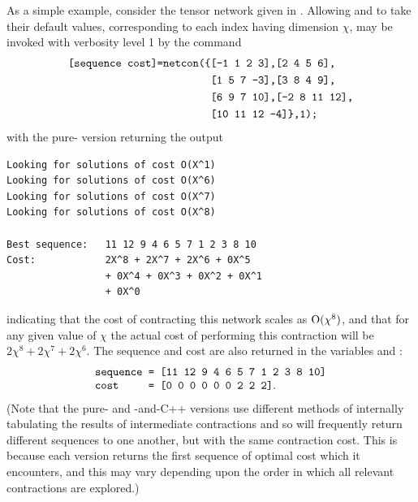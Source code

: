 
As a simple example, consider the tensor network given in . Allowing  and  to take their default values, corresponding to each index having dimension $\chi$,  may be invoked with verbosity level 1 by the command
\begin{align*}
\texttt{[sequence cost]=netcon(\{}&\texttt{[-1 1 2 3],[2 4 5 6],}\\
&\texttt{[1 5 7 -3],[3 8 4 9],}\\
&\texttt{[6 9 7 10],[-2 8 11 12],}\\
&\texttt{[10 11 12 -4]\},1);}
\end{align*}
with the pure-\MATLAB{} version returning the output
\begin{verbatim}
Looking for solutions of cost O(X^1)
Looking for solutions of cost O(X^6)
Looking for solutions of cost O(X^7)
Looking for solutions of cost O(X^8)
 
Best sequence:   11 12 9 4 6 5 7 1 2 3 8 10
Cost:            2X^8 + 2X^7 + 2X^6 + 0X^5
                 + 0X^4 + 0X^3 + 0X^2 + 0X^1
                 + 0X^0
\end{verbatim}
indicating that the cost of contracting this network scales as $\mathrm{O}(\chi^8)$, and that for any given value of $\chi$ the actual cost of performing this contraction will be $2\chi^8+2\chi^7+2\chi^6$. The sequence and cost are also returned in the variables  and :
\begin{equation*}
\begin{tabular}{l}
\ttt{sequence = [11 12 9 4 6 5 7 1 2 3 8 10]}\\
\ttt{cost~~~~~= [0 0 0 0 0 0 2 2 2]}.
\end{tabular}
\end{equation*}
(Note that the pure-\MATLAB{} and \MATLAB{}-and-C++ versions use different methods of internally tabulating the results of intermediate contractions and so will frequently return different sequences to one another, but with the same contraction cost. This is because each version returns the first sequence of optimal cost which it encounters, and this may vary depending upon the order in which all relevant contractions are explored.)


